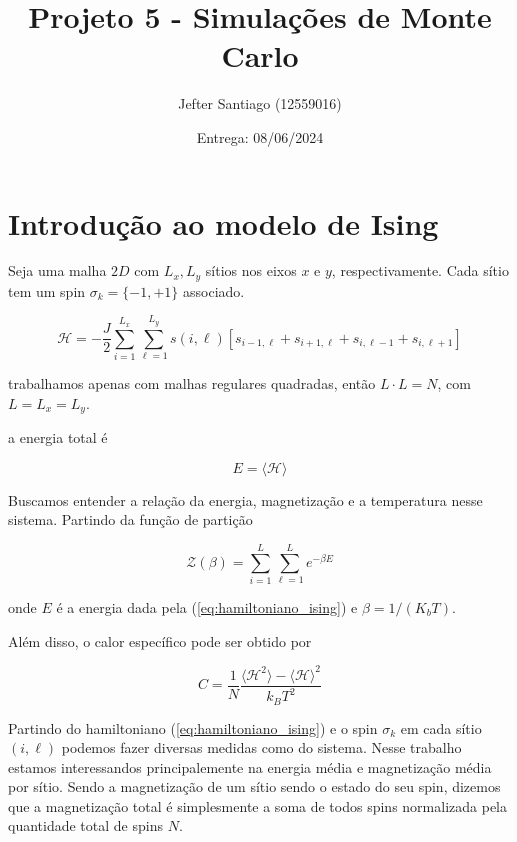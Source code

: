 \documentclass{tufte-handout}
\title{Projeto 5 - Simulações de Monte Carlo}
\author{Jefter Santiago (12559016)}
\date{Entrega: 08/06/2024}
\begin{document}
\maketitle

\section{Introdução ao modelo de Ising}

Seja uma malha $2D$ com $L_x, L_y$ sítios nos eixos 
$x$ e $y$, respectivamente. Cada sítio tem um spin $\sigma_k = \{ -1, +1 \}$ associado. 

\begin{equation}
  \mathcal{H} = -\frac{J}{2} \sum_{i = 1}^{L_x}\sum_{\ell = 1}^{L_y} s(i, \ell) \left[s_{i-1,\ell}+s_{i+1, \ell}+s_{i, \ell-1}+s_{i, \ell + 1}\right]
  \label{eq:hamiltoniano_ising}
\end{equation}

trabalhamos apenas com malhas regulares quadradas, então $L \cdot L = N$, com $L=L_x=L_y$. 

a energia total é 

\begin{equation}
    E = \langle \mathcal{H} \rangle
\end{equation}


Buscamos entender a relação da energia, magnetização 
e a temperatura nesse sistema. 
Partindo da função de partição 

\begin{equation}
    \mathcal{Z}(\beta) = \sum_{i = 1}^{L} \sum_{\ell = 1}^{L} e^{-\beta E}
    \label{eq:funcao_particao}
\end{equation} 

onde $E$ é a energia dada pela (\ref{eq:hamiltoniano_ising}) e $\beta = 1/(K_bT)$.

Além disso, o calor específico pode ser obtido por 


\begin{equation}
    C = \frac{1}{N}\frac{\langle \mathcal{H}^2 \rangle - \langle \mathcal{H} \rangle^2}{k_B T^2}
    \label{eq:calor_especifico}
\end{equation}


Partindo do hamiltoniano (\ref{eq:hamiltoniano_ising}) e o spin $\sigma_k$ em cada sítio
$(i, \ell)$ podemos fazer diversas medidas como do sistema. 
Nesse trabalho estamos interessandos principalemente na energia média e magnetização média por sítio. 
Sendo a magnetização de um sítio sendo o estado do seu spin, dizemos que a magnetização 
total é simplesmente a soma de todos spins normalizada pela quantidade total de spins $N$.
\end{document}
